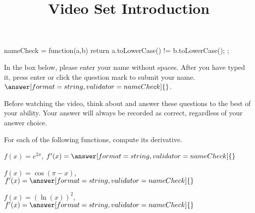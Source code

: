 \documentclass[handout]{ximera}
\title{Video Set Introduction}
\begin{document}
\begin{abstract}
\end{abstract}


\maketitle


\begin{javascript}
  nameCheck = function(a,b) {
    return a.toLowerCase() != b.toLowerCase();
  };
\end{javascript}

In the box below, please enter your name without spaces. After you have typed it, press enter or click the question mark to submit your name.\\
$\answer[format=string,validator=nameCheck]{}$.

Before watching the video, think about and answer these questions to the best of your ability. Your answer will always be recorded as correct, regardless of your answer choice.

For each of the following functions, compute its derivative.

\begin{problem}
$f(x)=e^{2x}$, $f'(x)=\answer[format=string,validator=nameCheck]{}$
\end{problem}

\begin{problem}
$f(x)=\cos(\pi-x)$, $f'(x)=\answer[format=string,validator=nameCheck]{}$
\end{problem}

\begin{problem}
$f(x)=(\ln(x))^2$, $f'(x)=\answer[format=string,validator=nameCheck]{}$
\end{problem}
\end{document}
